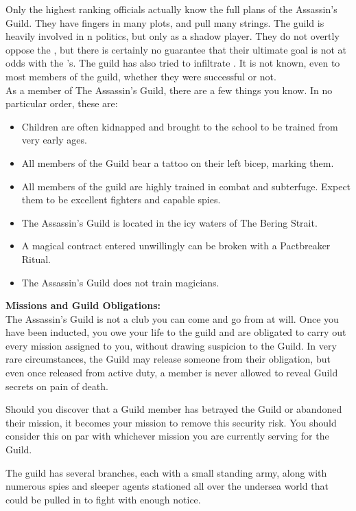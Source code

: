 \documentclass[blue]{NeptuneBall}
\begin{document}
\name{\bAssassin{}}

Only the highest ranking officials actually know the full plans of the Assassin's Guild. They have fingers in many plots, and pull many strings. The guild is heavily involved in \pPacifica{}n politics, but only as a shadow player.  They do not overtly oppose the \cPacificanRuler{\King}, but there is certainly no guarantee that their ultimate goal is not at odds with the \cPacificanRuler{\King}'s. The guild has also tried to infiltrate \pAtlantis{}. It is not known, even to most members of the guild, whether they were successful or not.\\

As a member of The Assassin's Guild, there are a few things you know. In no particular order, these are:

\begin{itemize}
  \item Children are often kidnapped and brought to the school to be trained from very early ages.
  \item All members of the Guild bear a tattoo on their left bicep, marking them.
  \item All members of the guild are highly trained in combat and subterfuge. Expect them to be excellent fighters and capable spies.
  \item The Assassin's Guild is located in the icy waters of The Bering Strait.
	\item A magical contract entered unwillingly can be broken with a Pactbreaker Ritual.
  \item The Assassin's Guild does not train magicians.\\
\end{itemize}

{\bf Missions and Guild Obligations:}\\
The Assassin's Guild is not a club you can come and go from at will. Once you have been inducted, you owe your life to the guild and are obligated to carry out every mission assigned to you, without drawing suspicion to the Guild. In very rare circumstances, the Guild may release someone from their obligation, but even once released from active duty, a member is never allowed to reveal Guild secrets on pain of death.

Should you discover that a Guild member has betrayed the Guild or abandoned their mission, it becomes your mission to remove this security risk. You should consider this on par with whichever mission you are currently serving for the Guild.

\begin{itemz}[Trivia]
	\item The guild has several branches, each with a small standing army, along with numerous spies and sleeper agents stationed all over the undersea world that could be pulled in to fight with enough notice.
\end{itemz}
\end{document}
